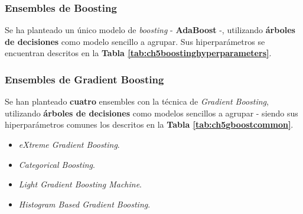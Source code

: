 \subsubsection{Ensembles de Boosting}

Se ha planteado un único modelo de \textit{boosting} - \textbf{AdaBoost} -, utilizando \textbf{árboles de decisiones} como modelo sencillo a agrupar. Sus hiperparámetros se encuentran descritos en la \textbf{Tabla \ref{tab:ch5boostinghyperparameters}}.

\begin{table}[h]
	\vspace{-8mm}
	\centering
	\captionsetup{belowskip=-40pt, justification=centering}
	\caption{Hiperparámetros planteados para ensembles de boosting}
	\label{tab:ch5boostinghyperparameters}
\end{table}

\subsubsection{Ensembles de Gradient Boosting}

Se han planteado \textbf{cuatro} ensembles con la técnica de \textit{Gradient Boosting}, utilizando \textbf{árboles de decisiones} como modelos sencillos a agrupar - siendo sus hiperparámetros comunes los descritos en la \textbf{Tabla \ref{tab:ch5gboostcommon}}.

\begin{itemize}[parsep=1pt, itemsep=0pt, topsep=1pt]
	\item \textit{eXtreme Gradient Boosting}.
	\item \textit{Categorical Boosting}.
	\item \textit{Light Gradient Boosting Machine}.
	\item \textit{Histogram Based Gradient Boosting}.
\end{itemize}

